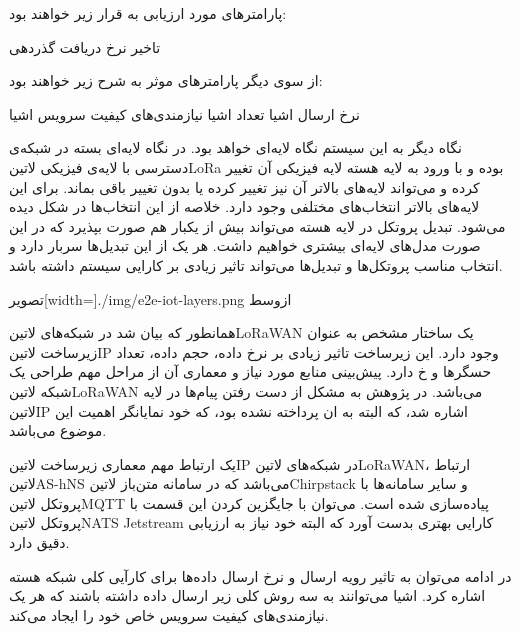 پارامترهای مورد ارزیابی به قرار زیر خواهند بود:

 تاخیر
 نرخ دریافت
 گذردهی

از سوی دیگر پارامترهای موثر به شرح زیر خواهند بود:

 نرخ ارسال اشیا
 تعداد اشیا
 نیازمندی‌های کیفیت سرویس اشیا

نگاه دیگر به این سیستم نگاه لایه‌ای خواهد بود. در نگاه لایه‌ای بسته در شبکه‌ی دسترسی با لایه‌ی فیزیکی ‌لاتین{LoRa} بوده و با ورود به لایه هسته
لایه فیزیکی آن تغییر کرده و می‌تواند لایه‌های بالاتر آن نیز تغییر کرده یا بدون تغییر باقی بماند. برای این لایه‌های بالاتر انتخاب‌های مختلفی وجود دارد.
خلاصه از این انتخاب‌ها در شکل  دیده می‌شود.
تبدیل پروتکل در لایه هسته می‌تواند بیش از یکبار هم صورت بپذیرد که در این صورت مدل‌های لایه‌ای بیشتری خواهیم داشت. هر یک از این تبدیل‌ها
سربار دارد و انتخاب مناسب پروتکل‌ها و تبدیل‌ها می‌تواند تاثیر زیادی بر کارایی سیستم داشته باشد.

‌تصویر[width=\textwidth]{./img/e2e-iot-layers.png}
‌ازوسط


همانطور که بیان شد در شبکه‌های ‌لاتین{LoRaWAN} یک ساختار مشخص به عنوان زیرساخت ‌لاتین{IP} وجود دارد.
این زیرساخت تاثیر زیادی بر نرخ داده، حجم داده، تعداد حسگرها و ‌خ دارد. پیش‌بینی منابع مورد نیاز و معماری آن از مراحل مهم طراحی یک شبکه ‌لاتین{LoRaWAN} می‌باشد.
در پژوهش  به مشکل از دست رفتن پیام‌ها در لایه ‌لاتین{IP} اشاره شد، که البته به ان پرداخته نشده بود، که خود نمایانگر اهمیت این موضوع می‌باشد.

یک ارتباط مهم معماری زیرساخت ‌لاتین{IP} در شبکه‌های ‌لاتین{LoRaWAN}،
ارتباط ‌لاتین{AS-hNS} می‌باشد که در سامانه متن‌باز ‌لاتین{Chirpstack} و سایر سامانه‌ها با پروتکل ‌لاتین{MQTT} پیاده‌سازی شده است.
می‌توان با جایگزین کردن این قسمت با پروتکل ‌لاتین{NATS Jetstream} کارایی بهتری بدست آورد که البته خود نیاز به ارزیابی دقیق دارد.

در ادامه می‌توان به تاثیر رویه ارسال و نرخ ارسال داده‌ها برای کارآیی کلی شبکه هسته اشاره کرد.
اشیا می‌توانند به سه روش کلی زیر ارسال داده داشته باشند که هر یک نیازمندی‌های کیفیت سرویس خاص خود را ایجاد می‌کند.


